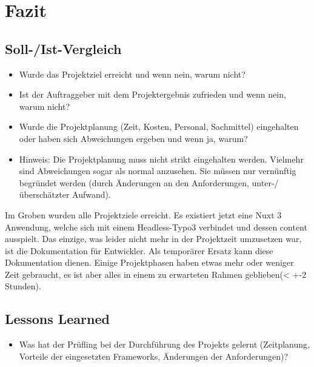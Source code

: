 \section{Fazit} 
\label{sec:Fazit}

\subsection{Soll-/Ist-Vergleich}
\label{sec:SollIstVergleich}

\begin{itemize}
	\item Wurde das Projektziel erreicht und wenn nein, warum nicht?
	\item Ist der Auftraggeber mit dem Projektergebnis zufrieden und wenn nein, warum nicht?
	\item Wurde die Projektplanung (Zeit, Kosten, Personal, Sachmittel) eingehalten oder haben sich Abweichungen ergeben und wenn ja, warum?
	\item Hinweis: Die Projektplanung muss nicht strikt eingehalten werden. Vielmehr sind Abweichungen sogar als normal anzusehen. Sie müssen nur vernünftig begründet werden (\zB durch Änderungen an den Anforderungen, unter-/überschätzter Aufwand).
\end{itemize}

Im Groben wurden alle Projektziele erreicht. Es existiert jetzt eine Nuxt 3 Anwendung, welche sich mit einem Headless-Typo3 verbindet und dessen content ausspielt. Das einzige, was leider nicht mehr in der Projektzeit umzusetzen war, ist die Dokumentation für Entwickler. Als temporärer Ersatz kann diese Dokumentation dienen. Einige Projektphasen haben etwas mehr oder weniger Zeit gebraucht, es ist aber alles in einem zu erwarteten Rahmen geblieben(< +-2 Stunden).



\subsection{Lessons Learned}
\label{sec:LessonsLearned}

\begin{itemize}
	\item Was hat der Prüfling bei der Durchführung des Projekts gelernt (\zB Zeitplanung, Vorteile der eingesetzten Frameworks, Änderungen der Anforderungen)?
\end{itemize}

